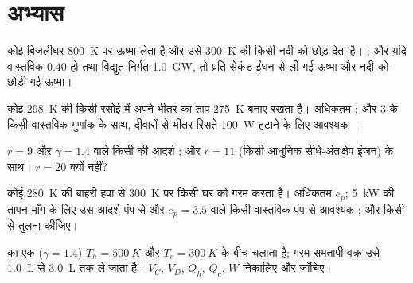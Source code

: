 \section{अभ्यास}

\begin{exercise}[$\star$]\label{exo:b1:heat-engines:1}
कोई बिजलीघर \qty{800}{K} पर ऊष्मा लेता है और उसे \qty{300}{K} की किसी नदी
को छोड़ देता है। ; और यदि वास्तविक  $0.40$ हो तथा
विद्युत निर्गत \qty{1.0}{GW}, तो प्रति सेकंड ईंधन से ली गई ऊष्मा और नदी को
छोड़ी गई ऊष्मा।
\end{exercise}

\begin{exercise}[$\star$]\label{exo:b1:heat-engines:2}
कोई  \qty{298}{K} की किसी रसोई में अपने भीतर का ताप \qty{275}{K}
बनाए रखता है। अधिकतम ; और $3$ के किसी वास्तविक गुणांक के
साथ, दीवारों से भीतर रिसते \qty{100}{W} हटाने के लिए आवश्यक ।
\end{exercise}

\begin{exercise}[$\star$]\label{exo:b1:heat-engines:3}
$r = 9$ और $\gamma = 1.4$ वाले किसी  की आदर्श ; और $r = 11$
(किसी आधुनिक सीधे-अंतःक्षेप इंजन) के साथ। $r = 20$ क्यों नहीं?
\end{exercise}

\begin{exercise}[$\star$]\label{exo:b1:heat-engines:4}
कोई  \qty{280}{K} की बाहरी हवा से \qty{300}{K} पर किसी घर को गरम
करता है। अधिकतम $e_p$; \qty{5}{kW} की तापन-माँग के लिए उस आदर्श पंप से और
$e_p = 3.5$ वाले किसी वास्तविक पंप से आवश्यक ; और किसी
 से तुलना कीजिए।
\end{exercise}

\begin{exercise}[$\star\star$]\label{exo:b1:heat-engines:5}
 का एक  ($\gamma = 1.4$) $T_h = \qty{500}{K}$ और
$T_c = \qty{300}{K}$ के बीच  चलाता है; गरम समतापी वक्र उसे
\qty{1.0}{L} से \qty{3.0}{L} तक ले जाता है। $V_C$, $V_D$, $Q_h$, $Q_c$,
$W$ निकालिए और  जाँचिए।
\end{exercise}

